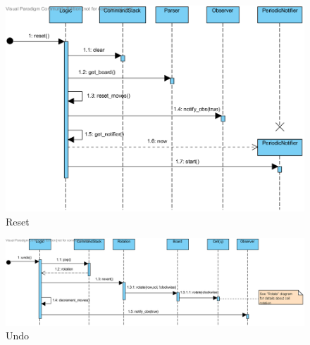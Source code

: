 \documentclass[a4paper,11pt]{article}
\begin{document}
\begin{figure}
	\center
	\includegraphics[angle=90,scale=1]{reset.png}
	\caption{Reset}
	\label{fig:reset}
\end{figure}
\begin{figure}
	\center
	\includegraphics[angle=90,scale=1]{undo.png}
	\caption{Undo}
	\label{fig:undo}
\end{figure}
\end{document}
